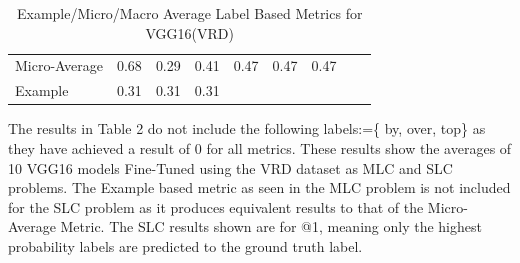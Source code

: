 \documentclass{csfyp}
\begin{document}
\begin{table}[!htbp]
\begin{tabular}{|l|l|l|l|l|l|l|l|l}
Micro-Average &	0.68	&	0.29	&	0.41	&	0.47	&	0.47	&	0.47 \\ \cline{1-7}
Example       &	0.31	&	0.31	&	0.31  \\ \cline{1-4}
\end{tabular}
\caption{Example/Micro/Macro Average Label Based Metrics for VGG16(VRD)}
The results in Table 2 do not include the following labels:=\{ by, over, top\} as they have achieved a result of 0 for all metrics. These results show the averages of 10 VGG16 models Fine-Tuned using the VRD dataset as MLC and SLC problems. The Example based metric as seen in the MLC problem is not included for the SLC problem as it produces equivalent results to that of the Micro-Average Metric.  The SLC results shown are for @1, meaning only the highest probability labels are predicted to the ground truth label.
\vspace{-4mm}
\end{table}
\end{document}
